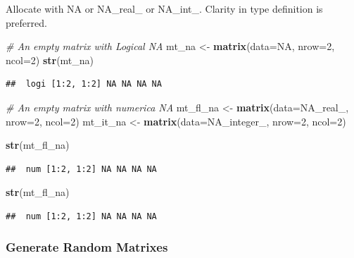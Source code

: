 \documentclass[
]{book}
\newenvironment{Shaded}{\begin{snugshade}}{\end{snugshade}}
\newcommand{\CommentTok}[1]{\textcolor[rgb]{0.56,0.35,0.01}{\textit{#1}}}
\newcommand{\DataTypeTok}[1]{\textcolor[rgb]{0.13,0.29,0.53}{#1}}
\newcommand{\DecValTok}[1]{\textcolor[rgb]{0.00,0.00,0.81}{#1}}
\newcommand{\KeywordTok}[1]{\textcolor[rgb]{0.13,0.29,0.53}{\textbf{#1}}}
\newcommand{\NormalTok}[1]{#1}
\newcommand{\OtherTok}[1]{\textcolor[rgb]{0.56,0.35,0.01}{#1}}
\newcommand{\StringTok}[1]{\textcolor[rgb]{0.31,0.60,0.02}{#1}}
\begin{document}
Allocate with NA or NA\_real\_ or NA\_int\_. Clarity in type definition is preferred.

\begin{Shaded}
\begin{Highlighting}[]
\CommentTok{\# An empty matrix with Logical NA}
\NormalTok{mt\_na \textless{}{-}}\StringTok{ }\KeywordTok{matrix}\NormalTok{(}\DataTypeTok{data=}\OtherTok{NA}\NormalTok{, }\DataTypeTok{nrow=}\DecValTok{2}\NormalTok{, }\DataTypeTok{ncol=}\DecValTok{2}\NormalTok{)}
\KeywordTok{str}\NormalTok{(mt\_na)}
\end{Highlighting}
\end{Shaded}

\begin{verbatim}
##  logi [1:2, 1:2] NA NA NA NA
\end{verbatim}

\begin{Shaded}
\begin{Highlighting}[]
\CommentTok{\# An empty matrix with numerica NA}
\NormalTok{mt\_fl\_na \textless{}{-}}\StringTok{ }\KeywordTok{matrix}\NormalTok{(}\DataTypeTok{data=}\OtherTok{NA\_real\_}\NormalTok{, }\DataTypeTok{nrow=}\DecValTok{2}\NormalTok{, }\DataTypeTok{ncol=}\DecValTok{2}\NormalTok{)}
\NormalTok{mt\_it\_na \textless{}{-}}\StringTok{ }\KeywordTok{matrix}\NormalTok{(}\DataTypeTok{data=}\OtherTok{NA\_integer\_}\NormalTok{, }\DataTypeTok{nrow=}\DecValTok{2}\NormalTok{, }\DataTypeTok{ncol=}\DecValTok{2}\NormalTok{)}

\KeywordTok{str}\NormalTok{(mt\_fl\_na)}
\end{Highlighting}
\end{Shaded}

\begin{verbatim}
##  num [1:2, 1:2] NA NA NA NA
\end{verbatim}

\begin{Shaded}
\begin{Highlighting}[]
\KeywordTok{str}\NormalTok{(mt\_fl\_na)}
\end{Highlighting}
\end{Shaded}

\begin{verbatim}
##  num [1:2, 1:2] NA NA NA NA
\end{verbatim}

\hypertarget{generate-random-matrixes}{%
\subsubsection{Generate Random Matrixes}\label{generate-random-matrixes}}
\end{document}
